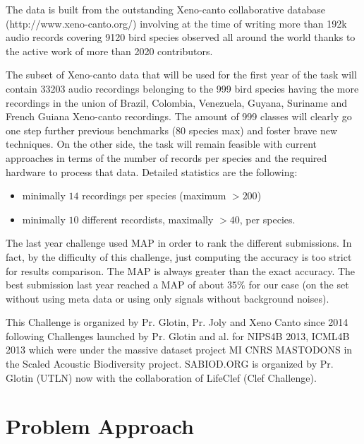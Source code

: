 \documentclass[a4paper]{report}
\begin{document}
The data is built from the outstanding Xeno-canto collaborative database (http://www.xeno-canto.org/) involving at the time of writing more than 192k audio records covering 9120 bird species observed all around the world thanks to the active work of more than 2020 contributors.

The subset of Xeno-canto data that will be used for the first year of the task will contain 33203 audio recordings belonging to the 999 bird species having the more recordings in the union of Brazil, Colombia, Venezuela, Guyana, Suriname and French Guiana Xeno-canto recordings. The amount of 999 classes will clearly go one step further previous benchmarks (80 species max) and foster brave new techniques. On the other side, the task will remain feasible with current approaches in terms of the number of records per species and the required hardware to process that data. Detailed statistics are the following:
\begin{itemize}
\item minimally $14$ recordings per species (maximum $>200$)
\item minimally $10$ different recordists, maximally $>40$, per species.
\end{itemize}
The last year challenge used MAP in order to rank the different submissions. In fact, by the difficulty of this challenge, just computing the accuracy is too strict for results comparison. The MAP is always greater than the exact accuracy. The best submission last year reached a MAP of about $35\%$ for our case (on the set without using meta data or using only signals without background noises).


This Challenge is organized by Pr. Glotin, Pr. Joly and Xeno Canto since 2014 following Challenges launched by Pr. Glotin and al. for NIPS4B 2013, ICML4B 2013 which were under the massive dataset project MI CNRS MASTODONS in the Scaled Acoustic Biodiversity project.
SABIOD.ORG is organized by Pr. Glotin (UTLN) now with the collaboration of LifeClef (Clef Challenge).
\section{Problem Approach}
\end{document}

